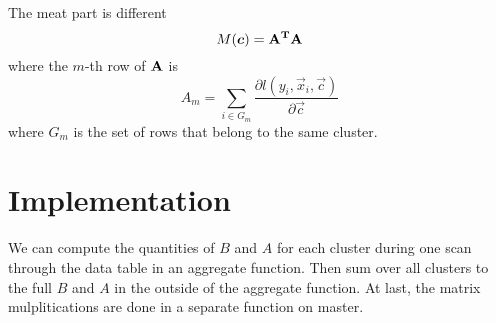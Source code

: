 The meat part is different
\begin{equation}
  M(\vec{c}) = \bf{A}^T\bf{A}
\end{equation}
where the $m$-th row of $\bf{A}$ is 
\begin{equation}
  A_m = \sum_{i\in G_m}\frac{\partial
      l(y_i,\vec{x}_i,\vec{c})}{\partial \vec{c}}
\end{equation}
where $G_m$ is the set of rows that belong to the same cluster.

\section{Implementation}

We can compute the quantities of $B$ and $A$ for each cluster during one scan through
the data table in an aggregate function. Then sum over all clusters to
the full $B$ and $A$ in the outside of the aggregate function. At last, the matrix mulplitications
are
done in a separate function on master.  
